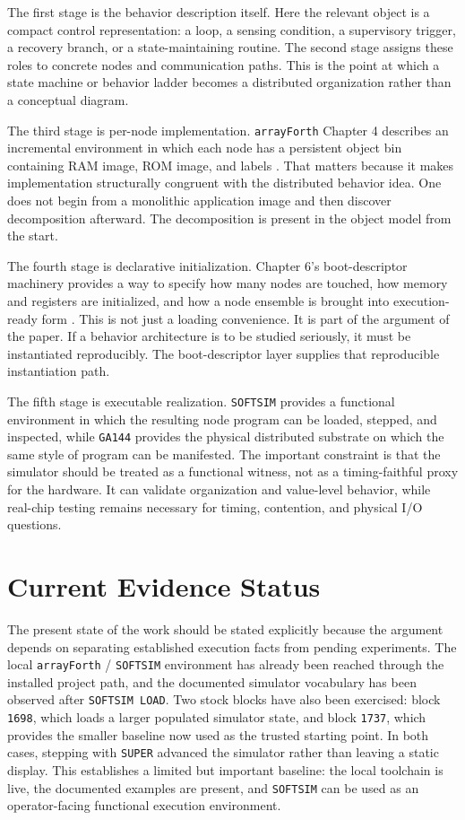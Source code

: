 \documentclass[11pt]{article}
\begin{document}
The first stage is the behavior description itself. Here the relevant object
is a compact control representation: a loop, a sensing condition, a
supervisory trigger, a recovery branch, or a state-maintaining routine. The
second stage assigns these roles to concrete nodes and communication paths.
This is the point at which a state machine or behavior ladder becomes a
distributed organization rather than a conceptual diagram.

The third stage is per-node implementation. \texttt{arrayForth} Chapter 4
describes an incremental environment in which each node has a persistent
object bin containing RAM image, ROM image, and labels
\citep{greenarrays2011db013}. That matters because it makes implementation
structurally congruent with the distributed behavior idea. One does not
begin from a monolithic application image and then discover decomposition
afterward. The decomposition is present in the object model from the start.

The fourth stage is declarative initialization. Chapter 6's boot-descriptor
machinery provides a way to specify how many nodes are touched, how memory
and registers are initialized, and how a node ensemble is brought into
execution-ready form \citep{greenarrays2011db013}. This is not just a
loading convenience. It is part of the argument of the paper. If a behavior
architecture is to be studied seriously, it must be instantiated
reproducibly. The boot-descriptor layer supplies that reproducible
instantiation path.

The fifth stage is executable realization. \texttt{SOFTSIM} provides a
functional environment in which the resulting node program can be loaded,
stepped, and inspected, while \texttt{GA144} provides the physical
distributed substrate on which the same style of program can be manifested.
The important constraint is that the simulator should be treated as a
functional witness, not as a timing-faithful proxy for the hardware. It can
validate organization and value-level behavior, while real-chip testing
remains necessary for timing, contention, and physical I/O questions.

\section{Current Evidence Status}

The present state of the work should be stated explicitly because the
argument depends on separating established execution facts from pending
experiments. The local \texttt{arrayForth} / \texttt{SOFTSIM} environment
has already been reached through the installed project path, and the
documented simulator vocabulary has been observed after \texttt{SOFTSIM
LOAD}. Two stock blocks have also been exercised: block \texttt{1698},
which loads a larger populated simulator state, and block \texttt{1737},
which provides the smaller baseline now used as the trusted starting point.
In both cases, stepping with \texttt{SUPER} advanced the simulator rather
than leaving a static display. This establishes a limited but important
baseline: the local toolchain is live, the documented examples are present,
and \texttt{SOFTSIM} can be used as an operator-facing functional execution
environment.
\end{document}
